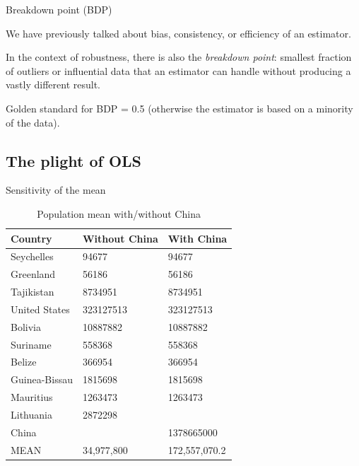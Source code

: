 \documentclass[12pt,english,pdf,xcolor=dvipsnames,aspectratio=169,handout]{beamer}\usepackage[]{graphicx}\usepackage[]{xcolor}
\begin{document}
\begin{frame}{Breakdown point (BDP)}

We have previously talked about bias, consistency, or efficiency of an estimator.\bigskip

In the context of robustness, there is also the \textit{breakdown point}: smallest fraction of outliers or influential data that an estimator can handle without producing a vastly different result.\bigskip

Golden standard for BDP = 0.5 (otherwise the estimator is based on a minority of the data).

\end{frame}





\subsection{The plight of OLS}

\begin{frame}[fragile]{Sensitivity of the mean}



\begin{table}[ht]
\centering
\footnotesize
\begin{tabular}{lll}
  \toprule
Country & Without China & With China \\ 
  \midrule
  Seychelles & 94677 & 94677 \\ 
  Greenland & 56186 & 56186 \\ 
  Tajikistan & 8734951 & 8734951 \\ 
  United States & 323127513 & 323127513 \\ 
  Bolivia & 10887882 & 10887882 \\ 
  Suriname & 558368 & 558368 \\ 
  Belize & 366954 & 366954 \\ 
  Guinea-Bissau & 1815698 & 1815698 \\ 
  Mauritius & 1263473 & 1263473 \\ 
  Lithuania & 2872298 &  \\ 
  China &  & 1378665000 \\ 
\midrule
  MEAN & 34,977,800 & 172,557,070.2 \\ 
   \bottomrule
\end{tabular}
\caption{Population mean with/without China} 
\end{table}

\end{frame}
\end{document}
